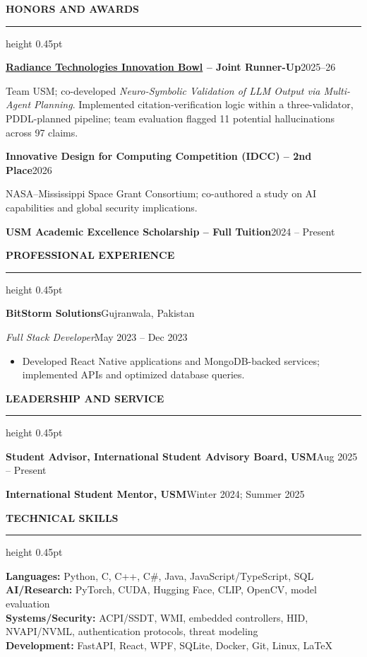 \documentclass[11pt]{article}
\newcommand{\cvsection}[1]{%
  \Needspace{4\baselineskip}%
  \par\addvspace{8.5pt}%
  \noindent\textbf{\MakeUppercase{#1}}\par\nobreak
  \vspace{2pt}\hrule height 0.45pt\relax\nobreak\vspace{4pt}%
}
\newcommand{\entryheading}[4]{%
  \textbf{#1}\hfill #2\par
  \textit{#3}\hfill #4\par
}
\newcommand{\subentry}[2]{\par\noindent\textbf{#1}\hfill #2\par}
\begin{document}
\cvsection{Honors and Awards}
\subentry{\href{https://www.radiancetechnologiesindependencebowl.com/radiance-technologies-announces-winner-of-2025-26-innovation-bowl/}{Radiance Technologies Innovation Bowl} -- Joint Runner-Up}{2025--26}
Team USM; co-developed \textit{Neuro-Symbolic Validation of LLM Output via Multi-Agent
Planning}. Implemented citation-verification logic within a three-validator,
PDDL-planned pipeline; team evaluation flagged 11 potential hallucinations
across 97 claims.
\par\vspace{2pt}
\subentry{Innovative Design for Computing Competition (IDCC) -- 2nd Place}{2026}
NASA--Mississippi Space Grant Consortium; co-authored a study on AI capabilities
and global security implications.
\par\vspace{2pt}
\subentry{USM Academic Excellence Scholarship -- Full Tuition}{2024 -- Present}

\cvsection{Professional Experience}
\entryheading{BitStorm Solutions}{Gujranwala, Pakistan}
  {Full Stack Developer}{May 2023 -- Dec 2023}
\begin{itemize}
  \item Developed React Native applications and MongoDB-backed services;
  implemented APIs and optimized database queries.
\end{itemize}

\cvsection{Leadership and Service}
\subentry{Student Advisor, International Student Advisory Board, USM}{Aug 2025 -- Present}
\subentry{International Student Mentor, USM}{Winter 2024; Summer 2025}

\cvsection{Technical Skills}
\textbf{Languages:} Python, C, C++, C\#, Java, JavaScript/TypeScript, SQL\\[2pt]
\textbf{AI/Research:} PyTorch, CUDA, Hugging Face, CLIP, OpenCV, model evaluation\\[2pt]
\textbf{Systems/Security:} ACPI/SSDT, WMI, embedded controllers, HID, NVAPI/NVML,
  authentication protocols, threat modeling\\[2pt]
\textbf{Development:} FastAPI, React, WPF, SQLite, Docker, Git, Linux, \LaTeX{}
\end{document}
